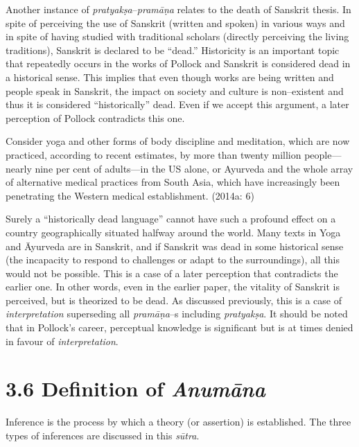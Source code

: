 Another instance of \textit{pratyakṣa}–\textit{pramāṇa }relates to the death of Sanskrit thesis. In spite of perceiving the use of Sanskrit (written and spoken) in various ways and in spite of having studied with traditional scholars (directly perceiving the living traditions), Sanskrit is declared to be “dead.” Historicity is an important topic that repeatedly occurs in the works of Pollock and Sanskrit is considered dead in a historical sense. This implies that even though works are being written and people speak in Sanskrit, the impact on society and culture is non–existent and thus it is considered “historically” dead. Even if we accept this argument, a later perception of Pollock contradicts this one.

\begin{myquote}
Consider yoga and other forms of body discipline and meditation, which are now practiced, according to recent estimates, by more than twenty million people—nearly nine per cent of adults—in the US alone, or Ayurveda and the whole array of alternative medical practices from South Asia, which have increasingly been penetrating the Western medical establishment. (2014a: 6)
\end{myquote}

Surely a “historically dead language” cannot have such a profound effect on a country geographically situated halfway around the world. Many texts in Yoga and Āyurveda are in Sanskrit, and if Sanskrit was dead in some historical sense (the incapacity to respond to challenges or adapt to the surroundings), all this would not be possible. This is a case of a later perception that contradicts the earlier one. In other words, even in the earlier paper, the vitality of Sanskrit is perceived, but is theorized to be dead. As discussed previously, this is a case of \textit{interpretation} superseding all \textit{pramāṇa}–s including\textit{ pratyakṣa}. It should be noted that in Pollock’s career, perceptual knowledge is significant but is at times denied in favour of \textit{interpretation}.

\vspace{-.3cm}

\section*{3.6 Definition of {\it {\bfseries Anumāna}}}

\vspace{-.2cm}

Inference is the process by which a theory (or assertion) is established. The three types of inferences are discussed in this \textit{sūtra}.

